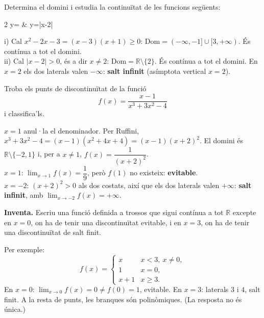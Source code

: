 \begin{apartats}

Determina el domini i estudia la continuïtat de les funcions següents:
\begin{graella}{2}
  \sa y= & \sa y=\ln|x-2|
\end{graella}

\begin{solucio}
i) Cal $x^2-2x-3=(x-3)(x+1)\ge0$: $\mathrm{Dom}=(-\infty,-1]\cup[3,+\infty)$.
És contínua a tot el domini.\\
ii) Cal $|x-2|>0$, és a dir $x\ne2$: $\mathrm{Dom}=\mathbb{R}\setminus\{2\}$.
És contínua a tot el domini. En $x=2$ els dos laterals valen $-\infty$:
\textbf{salt infinit} (asímptota vertical $x=2$).
\end{solucio}

Troba els punts de discontinuïtat de la funció
\[
f(x)=\frac{x-1}{x^3+3x^2-4}
\]
i classifica'ls.

\begin{solucio}
$x=1$ anul·la el denominador. Per Ruffini, $x^3+3x^2-4=(x-1)(x^2+4x+4)=(x-1)(x+2)^2$.
El domini és $\mathbb{R}\setminus\{-2,1\}$ i, per a $x\neq1$, $f(x)=\dfrac{1}{(x+2)^2}$.\\
$x=1$: $\lim_{x\to1}f(x)=\dfrac19$, però $f(1)$ no existeix: \textbf{evitable}.\\
$x=-2$: $(x+2)^2>0$ als dos costats, així que els dos laterals valen $+\infty$:
\textbf{salt infinit}, amb $\lim_{x\to-2}f(x)=+\infty$.
\end{solucio}

\textbf{Inventa.} Escriu una funció definida a trossos que sigui contínua a tot
$\mathbb{R}$ excepte en $x=0$, on ha de tenir una discontinuïtat evitable, i en $x=3$, on
ha de tenir una discontinuïtat de salt finit.

\begin{solucio}
Per exemple:
\[
f(x)=\begin{cases} x & \si{x<3,\ x\ne0},\\ 1 & \si{x=0},\\ x+1 & \si{x\ge3}.\end{cases}
\]
En $x=0$: $\lim_{x\to0}f(x)=0\ne f(0)=1$, evitable. En $x=3$: laterals $3$ i $4$, salt
finit. A la resta de punts, les branques són polinòmiques. (La resposta no és única.)
\end{solucio}

\end{apartats}
